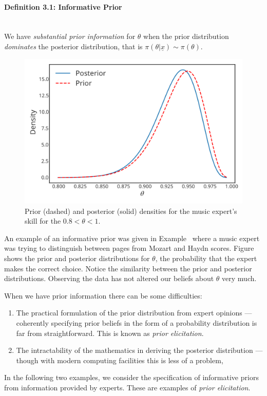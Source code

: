 \paragraph{Definition 3.1: Informative Prior}{~\\
We have \emph{substantial prior information} for $\theta$ when the prior distribution {\it dominates} the posterior distribution, that is
$\pi(\theta|\underline{x})\sim\pi(\theta)$.}
\begin{figure}[h!]

\includegraphics{images/priorposterior1.svg}
\caption{Prior (dashed) and posterior (solid) densities for the music expert's skill for the $0.8 < \theta < 1$.}


\end{figure}
An example of  an informative prior was given in Example~ where a music expert was trying to distinguish between pages from Mozart and Haydn scores. Figure~ shows the prior and posterior distributions for $\theta$, the probability that the expert makes the correct choice. Notice the similarity between the prior and posterior distributions. Observing the data has not altered our beliefs about $\theta$ very much.

When we have prior information there can be some difficulties:
\begin{enumerate}
\item The practical formulation of the prior distribution from expert opinions ---
coherently specifying prior beliefs in the form of a probability
distribution is far from straightforward. This is known as \emph{prior elicitation}.
\item The intractability of the mathematics in deriving the posterior
distribution --- though with modern computing facilities this is less
of a problem,
\end{enumerate}
In the following two examples, we consider the specification of informative priors from information provided by experts. These are examples of \emph{prior elicitation}.
\clearpage

